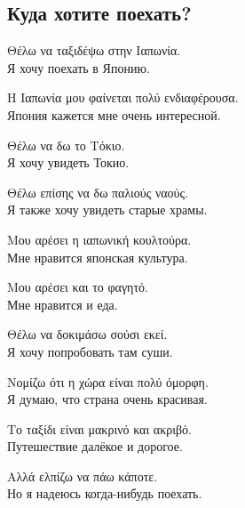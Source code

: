 \documentclass[12pt]{article}
\newcommand{\my}[1]{\textcolor{gray!80!white}{#1}}
\newenvironment{page}{\clearpage\normalsize\null\vfill}{\vfill\null}
\newenvironment{textblock}{\begin{minipage}{\textwidth}}{\end{minipage}\smallskip}
\begin{document}
	\begin{page}
		\subsection{Куда хотите поехать?}
		\small
		\begin{textblock}
			Θέλω να ταξιδέψω στην Ιαπωνία.\\
			\my{Я хочу поехать в Японию.}
			
			Η Ιαπωνία μου φαίνεται πολύ ενδιαφέρουσα.\\
			\my{Япония кажется мне очень интересной.}
			
			Θέλω να δω το Τόκιο.\\
			\my{Я хочу увидеть Токио.}
			
			Θέλω επίσης να δω παλιούς ναούς.\\
			\my{Я также хочу увидеть старые храмы.}
			
			Μου αρέσει η ιαπωνική κουλτούρα.\\
			\my{Мне нравится японская культура.}
			
			Μου αρέσει και το φαγητό.\\
			\my{Мне нравится и еда.}
			
			Θέλω να δοκιμάσω σούσι εκεί.\\
			\my{Я хочу попробовать там суши.}
			
			Νομίζω ότι η χώρα είναι πολύ όμορφη.\\
			\my{Я думаю, что страна очень красивая.}
			
			Το ταξίδι είναι μακρινό και ακριβό.\\
			\my{Путешествие далёкое и дорогое.}
			
			Αλλά ελπίζω να πάω κάποτε.\\
			\my{Но я надеюсь когда-нибудь поехать.}
		\end{textblock}
	\end{page}
	
\end{document}
